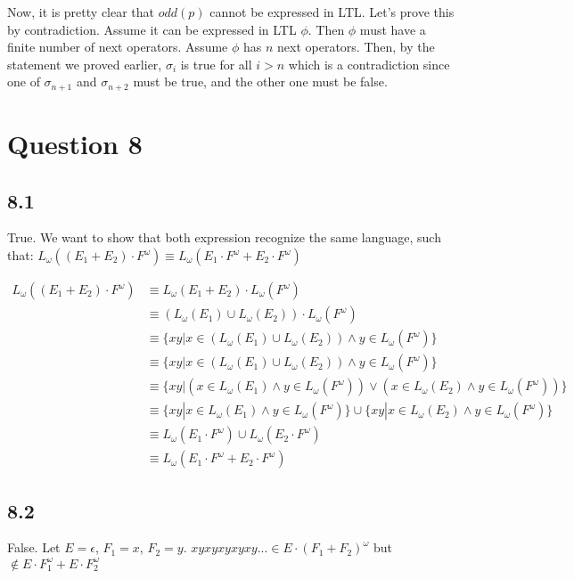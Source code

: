 \documentclass[a4paper, 11pt]{article}
\begin{document}
Now, it is pretty clear that $odd(p)$ cannot be expressed in LTL.
Let's prove this by contradiction.
Assume it can be expressed in LTL $\phi$. Then $\phi$ must have a finite number of next operators. Assume $\phi$ has $n$ next operators. Then, by the statement we
proved earlier, $\sigma_i$ is true for all $i > n$ which is a contradiction since
one of $\sigma_{n+1}$ and $\sigma_{n+2}$ must be true, and the other one must be false.


\section*{Question 8}
\subsection*{8.1}
True. We want to show that both expression recognize the same language, such that:
$L_\omega ((E_1+E_2)\cdot F^\omega ) \equiv L_\omega (E_1 \cdot F^\omega + E_2 \cdot F^\omega)$

\begin{align*}
     L_\omega ((E_1+E_2)\cdot F^\omega ) &\equiv L_\omega (E_1+E_2) \cdot L_\omega(F^\omega) \\
     &\equiv (L_\omega(E_1) \cup L_\omega(E_2)) \cdot L_\omega(F^\omega) \\
     &\equiv \{xy| x\in{(L_\omega(E_1) \cup L_\omega(E_2))} \wedge y\in{L_\omega(F^\omega)}\} \\
     &\equiv \{xy| x\in{(L_\omega(E_1) \cup L_\omega(E_2))} \wedge y\in{L_\omega(F^\omega)}\} \\
     &\equiv \{xy| (x\in{L_\omega(E_1)}\wedge{y \in L_\omega(F^\omega)}) \vee (x\in{L_\omega(E_2)}\wedge{y \in L_\omega(F^\omega)}) \} \\
     &\equiv \{xy| x\in{L_\omega(E_1)}\wedge{y \in L_\omega(F^\omega)}\} \cup \{xy| x\in{L_\omega(E_2)}\wedge{y \in L_\omega(F^\omega)}\} \\
     &\equiv L_\omega(E_1\cdot F^\omega) \cup L_\omega(E_2\cdot F^\omega) \\
     &\equiv L_\omega(E_1\cdot F^\omega + E_2\cdot F^\omega)
\end{align*}

\subsection*{8.2}
False.
Let $E=\epsilon$, $F_1=x$, $F_2=y$. $xyxyxyxyxy... \in E\cdot (F_1+F_2)^\omega$ but $\notin E\cdot F_1^\omega + E\cdot F_2^\omega$
\end{document}
